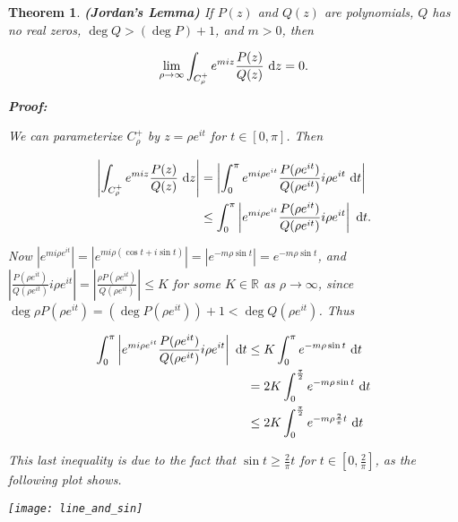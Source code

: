 \documentclass{article}
\theoremstyle{colontheorem}
\newtheorem{theorem}{Theorem}[section]
\newenvironment{Theorem}
{
	\begin{mdframed}[backgroundcolor=TheoremOrange!10]
	\begin{theorem}
}
{
	\end{theorem}
	\end{mdframed}
	
	\vspace{.15in}
}
\newenvironment{Proof}
{
	\begin{mdframed}[backgroundcolor=ProofPurple!10]
	\textbf{Proof:}%
}
{
	\end{mdframed}
	
	\vspace{.085in}
}
\begin{document}
\begin{Theorem}
	
	\textbf{(Jordan's Lemma)} If $P(z)$ and $Q(z)$ are polynomials, $Q$ has no real zeros, $\deg Q > (\deg P) + 1$, and $m > 0$, then
	
	$$
		\lim\limits_{\rho \to \infty} \int_{C_\rho^+} e^{m i z} \frac{P(z)}{Q(z)}\ \textnormal{d}z = 0.
	$$
	
	\begin{Proof}
		We can parameterize $C_\rho^+$ by $z = \rho e^{it}$ for $t \in [0, \pi]$. Then
		
		\begin{align*}
			\left| \int_{C_\rho^+} e^{m i z} \frac{P(z)}{Q(z)}\ \textnormal{d}z \right| &= \left| \int_0^\pi e^{m i \rho e^{it}} \frac{P(\rho e^{it})}{Q(\rho e^{it})} i \rho e^{it}\ \textnormal{d}t \right|\\
			& \leq \int_0^\pi  \left| e^{m i \rho e^{it}} \frac{P(\rho e^{it})}{Q(\rho e^{it})} i \rho e^{it} \right|\ \textnormal{d}t.
		\end{align*}
		
		Now $\left| e^{m i \rho e^{it}} \right| = \left| e^{m i \rho (\cos t + i \sin t)} \right| = \left| e^{-m \rho \sin t} \right| = e^{-m \rho \sin t}$, and $\left| \frac{P(\rho e^{it})}{Q(\rho e^{it})} i \rho e^{it} \right| = \left| \frac{\rho P(\rho e^{it})}{Q(\rho e^{it})} \right| \leq K$ for some $K \in \mathbb{R}$ as $\rho \to \infty$, since $\deg \rho P(\rho e^{it}) = (\deg P(\rho e^{it})) + 1 < \deg Q(\rho e^{it})$. Thus
		
		\begin{align*}
			\int_0^\pi  \left| e^{m i \rho e^{it}} \frac{P(\rho e^{it})}{Q(\rho e^{it})} i \rho e^{it} \right|\ \textnormal{d}t & \leq K \int_0^\pi e^{-m \rho \sin t}\ \textnormal{d}t\\
			&= 2K \int_0^{\frac{\pi}{2}} e^{-m \rho \sin t}\ \textnormal{d}t\\
			& \leq 2K \int_0^{\frac{\pi}{2}} e^{-m \rho \frac{2}{\pi} t}\ \textnormal{d}t\\
		\end{align*}
		
		This last inequality is due to the fact that $\sin t \geq \frac{2}{\pi} t$ for $t \in [0, \frac{2}{\pi}]$, as the following plot shows.
		
		\begin{center}
			
			\texttt{[image: line\_and\_sin]}
			
		\end{center}
		

\end{Proof}
\end{Theorem}
\end{document}

